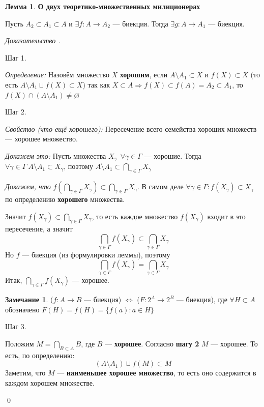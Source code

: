 \documentclass[12pt,oneside]{article}
\theoremstyle{definition}
\newtheorem{remark}{Замечание}[section]
\newtheorem{lemma}{Лемма}[section]
\newenvironment{ourproof}[1]{\textit{Доказательство #1.}}{\qed}
\begin{document}
\begin{lemma}\textbf{О двух теоретико-множественных милиционерах}\label{police}

Пусть $A_2\subset A_1\subset A$ и $\exists f : A \longrightarrow A_2$ --- биекция. Тогда $\exists g : A \longrightarrow A_1$ --- биекция.

\begin{ourproof}{}

Шаг 1. 

\textit{Определение: } Назовём множество $X$ \textbf{хорошим}, если $A\setminus A_1 \subset X$ и $f(X)\subset X$ (то есть $A\setminus A_1 \sqcup f(X) \subset X$) так как $X\subset A \Longrightarrow f(X)\subset f(A)=A_2\subset A_1$, то $f(X) \cap (A\setminus A_1) \neq \varnothing$

Шаг 2. 

\textit{Свойство (что ещё хорошего): } Пересечение всего семейства хороших множеств --- хорошее множество. 

\textit{Докажем это: } Пусть множества $X_{\gamma}\ \ \forall \gamma\in\Gamma$ --- хорошие. Тогда $\forall \gamma\in\Gamma\ A\setminus A_1\subset X_{\gamma}$, поэтому $A\setminus A_1\subset \displaystyle\bigcap_{\gamma\in\Gamma}X_{\gamma}$

\textit{Докажем, что } $f(\displaystyle\bigcap_{\gamma\in\Gamma}X_{\gamma})\subset \displaystyle\bigcap_{\gamma\in\Gamma}X_{\gamma}$. В самом деле $\forall \gamma\in\Gamma : f(X_{\gamma})\subset X_{\gamma}$ по определению \textbf{хорошего} множества.

Значит $f(X_{\gamma})\subset \displaystyle\bigcap_{\gamma\in\Gamma}X_{\gamma}$, то есть каждое множество $f(X_{\gamma})$ входит в это пересечение, а значит 
$$\displaystyle\bigcap_{\gamma\in\Gamma}f(X_{\gamma})\subset \displaystyle\bigcap_{\gamma\in\Gamma}X_{\gamma}$$
Но $f$ --- биекция (из формулировки леммы), поэтому
$$\displaystyle\bigcap_{\gamma\in\Gamma}f(X_{\gamma}) =  \displaystyle\bigcap_{\gamma\in\Gamma}X_{\gamma}$$
Итак, $\displaystyle\bigcap_{\gamma\in\Gamma}f(X_{\gamma})$ --- хорошее.

\begin{remark} ($f : A\longrightarrow B$ --- биекция) $\Longleftrightarrow$ ($F : 2^A \longrightarrow 2^B$ --- биекция), где $\forall H\subset A$ обозначено $F(H)=f(H)=\{f(a): a\in H\}$
\end{remark}

Шаг 3.

Положим $M=\displaystyle\bigcap_{B\subset A}B$, где $B$ --- \textbf{хорошее}. Согласно \textbf{шагу 2} $M$ --- хорошее. То есть, по определению:
$$(A\setminus A_1)\sqcup f(M) \subset M$$
Заметим, что $M$ --- \textbf{наименьшее хорошее множество}, то есть оно содержится в каждом хорошем множестве.


\end{ourproof}
\end{lemma}
\end{document}
